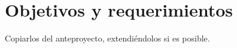 \chapter{Objetivos y requerimientos}
\label{sec:objetivos_y_requerimientos}
Copiarlos del anteproyecto, extendiéndolos si es posible.

